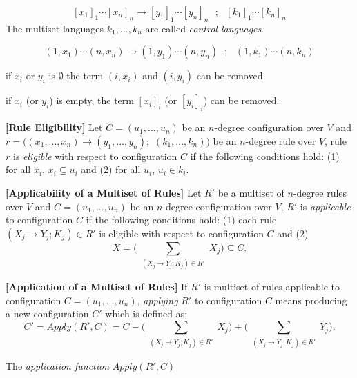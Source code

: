 \documentclass[a4paper]{article}
\theoremstyle{definition}
\newcommand{\ra}{\rightarrow}
\newcommand{\ts}{\text{ }}
\begin{document}
$${[x_1]}_1\cdots {[x_n]}_n \ra {[y_1]}_1\cdots{[y_n]}_n\ts ;\ts {[k_1]}_1\cdots{[k_n]}_n$$
The multiset languages $k_1,...,k_n$ are called \emph{control languages}.

$$(1,x_1)\cdots(n,x_n)\ra (1,y_1)\cdots(n,y_n)\ts;\ts (1,k_1)\cdots(n,k_n)$$

if $x_i$ or $y_i$ is $\emptyset$ the term $(i,x_i)$ and $(i,y_i)$ can be removed


if $x_i$ (or $y_i$) is empty, the term $[x_i]_i$ (or $[y_i]_i$) can be removed.


\label{def-elig} \textbf{[Rule Eligibility]} Let $C = (u_1,...,u_n)$ be an $n$-degree
configuration over $V$ and $r = ((x_1,...,x_n) \ra (y_1,...,y_n);$ $(k_1,...,k_n))$ be an $n$-degree
rule over $V$, rule $r$ is \emph{eligible} with respect to configuration $C$ if the following 
conditions hold: (1) for all $x_i$, $x_i \subseteq u_i$ and (2) for all $u_i$, $u_i \in k_i$.


\label{def-appc} \textbf{[Applicability of a Multiset of Rules]} Let $R'$ be a multiset 
of $n$-degree rules over $V$ and $C = (u_1,...,u_n)$ be an $n$-degree configuration over $V$, $R'$ 
is \emph{applicable} to configuration $C$ if the following conditions hold: (1) each rule 
$(X_j \ra Y_j;K_j) \in R'$ is eligible with respect to configuration $C$ and (2) 
$$X = \Bigg(\sum_{\substack{(X_j \ra Y_j; K_j) \in R'}} X_j\Bigg)\subseteq C.$$


\label{def-appl} \textbf{[Application of a Multiset of Rules]} If $R'$ is multiset of 
rules applicable to configuration $C = (u_1,...,u_n)$, \emph{applying} $R'$ to configuration $C$ 
means producing a new configuration $C'$ which is defined as: 
$$C' = Apply(R',C) =  C - \Bigg(\sum_{\substack{(X_j \ra Y_j; K_j) \in R'}} X_j\Bigg) +
\Bigg(\sum_{\substack{(X_j \ra Y_j; K_j) \in R'}} Y_j\Bigg).$$

The \emph{application function} $Apply(R',C)$

\end{document}
